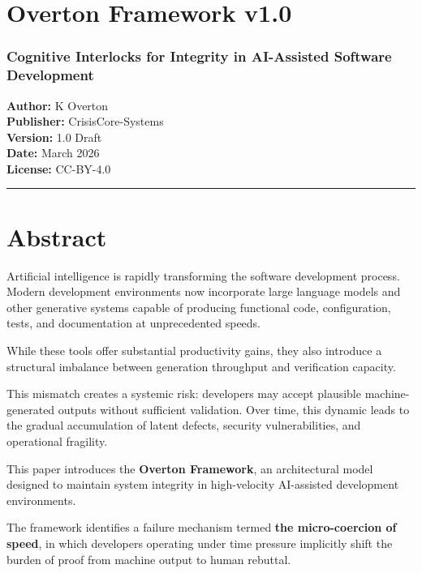 \documentclass[
]{article}
\author{}
\date{}
\begin{document}
\section{Overton Framework v1.0}\label{overton-framework-v10}

\subsubsection{Cognitive Interlocks for Integrity in AI-Assisted
Software
Development}\label{cognitive-interlocks-for-integrity-in-ai-assisted-software-development}

\textbf{Author:} K Overton\\
\textbf{Publisher:} CrisisCore-Systems\\
\textbf{Version:} 1.0 Draft\\
\textbf{Date:} March 2026\\
\textbf{License:} CC-BY-4.0

\begin{center}\rule{0.5\linewidth}{0.5pt}\end{center}

\section{Abstract}\label{abstract}

Artificial intelligence is rapidly transforming the software development
process.\\
Modern development environments now incorporate large language models
and other generative systems capable of producing functional code,
configuration, tests, and documentation at unprecedented speeds.

While these tools offer substantial productivity gains, they also
introduce a structural imbalance between generation throughput and
verification capacity.

This mismatch creates a systemic risk: developers may accept plausible
machine-generated outputs without sufficient validation. Over time, this
dynamic leads to the gradual accumulation of latent defects, security
vulnerabilities, and operational fragility.

This paper introduces the \textbf{Overton Framework}, an architectural
model designed to maintain system integrity in high-velocity AI-assisted
development environments.

The framework identifies a failure mechanism termed \textbf{the
micro-coercion of speed}, in which developers operating under time
pressure implicitly shift the burden of proof from machine output to
human rebuttal.
\end{document}
